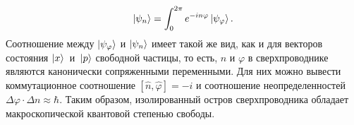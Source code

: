 \begin{equation}
\ket{\psi_n} = \int_{0}^{2 \pi}e^{-i n \varphi} \ket{\psi_\varphi}.
\end{equation} 
Соотношение между $\ket{\psi_\varphi}$ и $\ket{\psi_n}$ имеет такой же вид, как и для векторов состояния $\ket{x}$~и~$\ket{p}$ свободной частицы, то есть, $n$ и $\varphi$ в сверхпроводнике являются канонически сопряженными переменными. Для них можно вывести коммутационное соотношение $[\hat{n}, \hat{\varphi}]=-i$ и соотношение неопределенностей $\Delta\varphi \cdot \Delta n \approx \hbar$. Таким образом, изолированный остров сверхпроводника обладает макроскопической квантовой степенью свободы. 